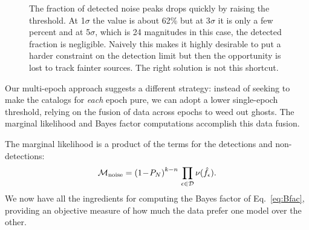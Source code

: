 \documentclass[twocolumn]{emulateapj}
\newcommand{\eind}{\epsilon}  %
\newcommand{\mlike}{\mathcal{M}}  %
\newcommand{\flux}{f}
\newcommand{\fest}{\hat{\flux}}  %
\newcommand{\dtxn}{\mathcal{D}}  %
\newcommand{\npd}{\nu}  %
\begin{document}
\begin{figure*}
\caption{The fraction of detected noise peaks drops quickly by raising the threshold. At 1$\sigma$ the value is about 62\% but at 3$\sigma$ it is only a few percent and at 5$\sigma$, which is 24 magnitudes in this case, the detected fraction is negligible. Naively this makes it highly desirable to put a harder constraint on the detection limit but then the opportunity is lost to track fainter sources. The right solution is not this shortcut.}
\label{fig:frac}
\end{figure*}


Our multi-epoch approach suggests a different strategy: instead of seeking to make the catalogs for \emph{each} epoch pure, we can adopt a lower single-epoch threshold, relying on the fusion of data across epochs to weed out ghosts.
The marginal likelihood and Bayes factor computations accomplish this data fusion.

The marginal likelihood is a product of the terms for the detections and non-detections:
%
\begin{equation}
\mlike_{\rm noise} = \left(1\!-\!P_N\right)^{k-n}\,\prod_{\eind \in \dtxn} \npd(\fest_\eind).
\end{equation}
%
We now have all the ingredients for computing the Bayes factor of Eq.~\ref{eq:Bfac}, providing an objective measure of how much the data prefer one model over the other. 


\end{document}
